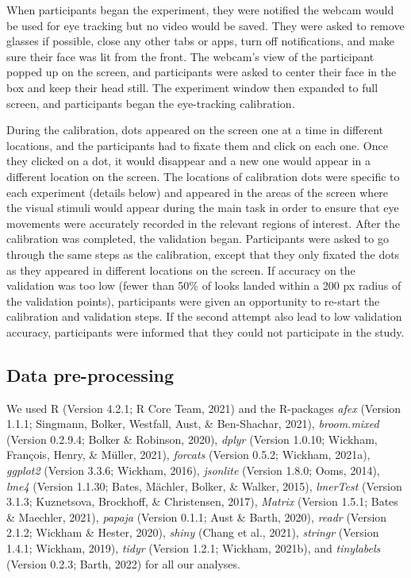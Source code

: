\documentclass[
  man,floatsintext]{apa6}
\begin{document}
When participants began the experiment, they were notified the webcam
would be used for eye tracking but no video would be saved. They were
asked to remove glasses if possible, close any other tabs or apps, turn
off notifications, and make sure their face was lit from the front. The
webcam's view of the participant popped up on the screen, and
participants were asked to center their face in the box and keep their
head still. The experiment window then expanded to full screen, and
participants began the eye-tracking calibration.

During the calibration, dots appeared on the screen one at a time in
different locations, and the participants had to fixate them and click
on each one. Once they clicked on a dot, it would disappear and a new
one would appear in a different location on the screen. The locations of
calibration dots were specific to each experiment (details below) and
appeared in the areas of the screen where the visual stimuli would
appear during the main task in order to ensure that eye movements were
accurately recorded in the relevant regions of interest. After the
calibration was completed, the validation began. Participants were asked
to go through the same steps as the calibration, except that they only
fixated the dots as they appeared in different locations on the screen.
If accuracy on the validation was too low (fewer than 50\% of looks
landed within a 200 px radius of the validation points),
participants were given an opportunity to re-start the calibration and
validation steps. If the second attempt also lead to low validation
accuracy, participants were informed that they could not participate in
the study.

\hypertarget{data-pre-processing}{%
\subsection{Data pre-processing}\label{data-pre-processing}}

We used R (Version 4.2.1; R Core Team, 2021) and the R-packages \emph{afex} (Version 1.1.1; Singmann, Bolker, Westfall, Aust, \& Ben-Shachar, 2021), \emph{broom.mixed} (Version 0.2.9.4; Bolker \& Robinson, 2020), \emph{dplyr} (Version 1.0.10; Wickham, François, Henry, \& Müller, 2021), \emph{forcats} (Version 0.5.2; Wickham, 2021a), \emph{ggplot2} (Version 3.3.6; Wickham, 2016), \emph{jsonlite} (Version 1.8.0; Ooms, 2014), \emph{lme4} (Version 1.1.30; Bates, Mächler, Bolker, \& Walker, 2015), \emph{lmerTest} (Version 3.1.3; Kuznetsova, Brockhoff, \& Christensen, 2017), \emph{Matrix} (Version 1.5.1; Bates \& Maechler, 2021), \emph{papaja} (Version 0.1.1; Aust \& Barth, 2020), \emph{readr} (Version 2.1.2; Wickham \& Hester, 2020), \emph{shiny} (Chang et al., 2021), \emph{stringr} (Version 1.4.1; Wickham, 2019), \emph{tidyr} (Version 1.2.1; Wickham, 2021b), and \emph{tinylabels} (Version 0.2.3; Barth, 2022) for all our analyses.
\end{document}
